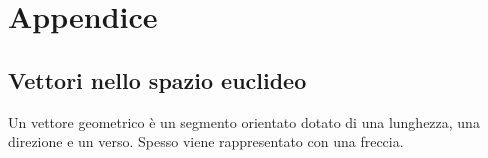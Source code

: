 \chapter{Appendice}
\label{chapter:appendix1} %


\section{Vettori nello spazio euclideo}


Un vettore geometrico {\`e} un segmento orientato
dotato di una lunghezza, una direzione e un verso.
Spesso viene rappresentato con una freccia.

